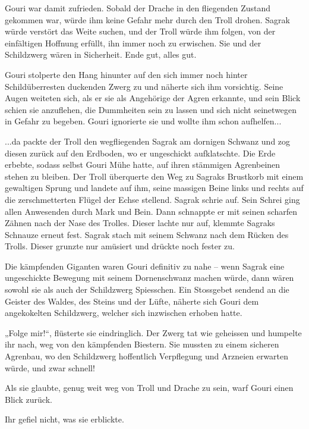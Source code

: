 \documentclass[10pt, a4paper, oneside]{book}
\begin{document}
Gouri war damit zufrieden. Sobald der Drache in den fliegenden Zustand gekommen war, würde ihm keine Gefahr mehr durch den Troll drohen. Sagrak würde verstört das Weite suchen, und der Troll würde ihm folgen, von der einfältigen Hoffnung erfüllt, ihn immer noch zu erwischen. Sie und der Schildzwerg wären in Sicherheit. Ende gut, alles gut.

Gouri stolperte den Hang hinunter auf den sich immer noch hinter Schildüberresten duckenden Zwerg zu und näherte sich ihm vorsichtig. Seine Augen weiteten sich, als er sie als Angehörige der Agren erkannte, und sein Blick schien sie anzuflehen, die Dummheiten sein zu lassen und sich nicht seinetwegen in Gefahr zu begeben. Gouri ignorierte sie und wollte ihm schon aufhelfen...

...da packte der Troll den wegfliegenden Sagrak am dornigen Schwanz und zog diesen zurück auf den Erdboden, wo er ungeschickt aufklatschte. Die Erde erbebte, sodass selbst Gouri Mühe hatte, auf ihren stämmigen Agrenbeinen stehen zu bleiben. Der Troll überquerte den Weg zu Sagraks Brustkorb mit einem gewaltigen Sprung und landete auf ihm, seine massigen Beine links und rechts auf die zerschmetterten Flügel der Echse stellend. Sagrak schrie auf. Sein Schrei ging allen Anwesenden durch Mark und Bein. Dann schnappte er mit seinen scharfen Zähnen nach der Nase des Trolles. Dieser lachte nur auf, klemmte Sagraks Schnauze erneut fest. Sagrak stach mit seinem Schwanz nach dem Rücken des Trolls. Dieser grunzte nur amüsiert und drückte noch fester zu.

Die kämpfenden Giganten waren Gouri definitiv zu nahe – wenn Sagrak eine ungeschickte Bewegung mit seinem Dornenschwanz machen würde, dann wären sowohl sie als auch der Schildzwerg Spiesschen. Ein Stossgebet sendend an die Geister des Waldes, des Steins und der Lüfte, näherte sich Gouri dem angekokelten Schildzwerg, welcher sich inzwischen erhoben hatte.

„Folge mir!“, flüsterte sie eindringlich. Der Zwerg tat wie geheissen und humpelte ihr nach, weg von den kämpfenden Biestern. Sie mussten zu einem sicheren Agrenbau, wo den Schildzwerg hoffentlich Verpflegung und Arzneien erwarten würde, und zwar schnell!

Als sie glaubte, genug weit weg von Troll und Drache zu sein, warf Gouri einen Blick zurück.

Ihr gefiel nicht, was sie erblickte.
\end{document}
